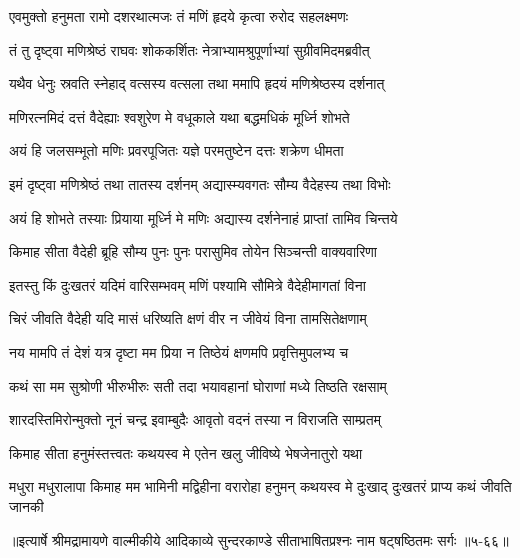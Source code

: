 
\twolineshloka
{एवमुक्तो हनुमता रामो दशरथात्मजः}
{तं मणिं हृदये कृत्वा रुरोद सहलक्ष्मणः} %

\twolineshloka
{तं तु दृष्ट्वा मणिश्रेष्ठं राघवः शोककर्शितः}
{नेत्राभ्यामश्रुपूर्णाभ्यां सुग्रीवमिदमब्रवीत्} %

\twolineshloka
{यथैव धेनुः स्रवति स्नेहाद् वत्सस्य वत्सला}
{तथा ममापि हृदयं मणिश्रेष्ठस्य दर्शनात्} %

\twolineshloka
{मणिरत्नमिदं दत्तं वैदेह्याः श्वशुरेण मे}
{वधूकाले यथा बद्धमधिकं मूर्ध्नि शोभते} %

\twolineshloka
{अयं हि जलसम्भूतो मणिः प्रवरपूजितः}
{यज्ञे परमतुष्टेन दत्तः शक्रेण धीमता} %

\twolineshloka
{इमं दृष्ट्वा मणिश्रेष्ठं तथा तातस्य दर्शनम्}
{अद्यास्म्यवगतः सौम्य वैदेहस्य तथा विभोः} %

\twolineshloka
{अयं हि शोभते तस्याः प्रियाया मूर्ध्नि मे मणिः}
{अद्यास्य दर्शनेनाहं प्राप्तां तामिव चिन्तये} %

\twolineshloka
{किमाह सीता वैदेही ब्रूहि सौम्य पुनः पुनः}
{परासुमिव तोयेन सिञ्चन्ती वाक्यवारिणा} %

\twolineshloka
{इतस्तु किं दुःखतरं यदिमं वारिसम्भवम्}
{मणिं पश्यामि सौमित्रे वैदेहीमागतां विना} %

\twolineshloka
{चिरं जीवति वैदेही यदि मासं धरिष्यति}
{क्षणं वीर न जीवेयं विना तामसितेक्षणाम्} %

\twolineshloka
{नय मामपि तं देशं यत्र दृष्टा मम प्रिया}
{न तिष्ठेयं क्षणमपि प्रवृत्तिमुपलभ्य च} %

\twolineshloka
{कथं सा मम सुश्रोणी भीरुभीरुः सती तदा}
{भयावहानां घोराणां मध्ये तिष्ठति रक्षसाम्} %

\twolineshloka
{शारदस्तिमिरोन्मुक्तो नूनं चन्द्र इवाम्बुदैः}
{आवृतो वदनं तस्या न विराजति साम्प्रतम्} %

\twolineshloka
{किमाह सीता हनुमंस्तत्त्वतः कथयस्व मे}
{एतेन खलु जीविष्ये भेषजेनातुरो यथा} %

\threelineshloka
{मधुरा मधुरालापा किमाह मम भामिनी}
{मद्विहीना वरारोहा हनुमन् कथयस्व मे}
{दुःखाद् दुःखतरं प्राप्य कथं जीवति जानकी} %


॥इत्यार्षे श्रीमद्रामायणे वाल्मीकीये आदिकाव्ये सुन्दरकाण्डे सीताभाषितप्रश्नः नाम षट्षष्ठितमः सर्गः ॥५-६६॥
